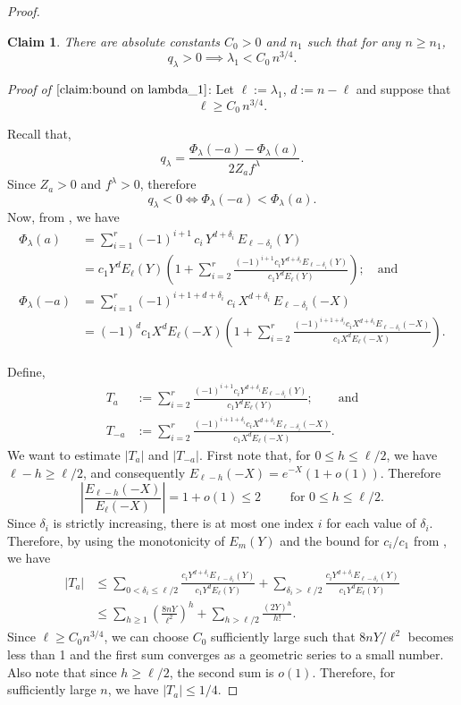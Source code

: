 \documentclass[12pt]{article}
\newtheorem{claim}{Claim}[theorem]
\theoremstyle{definition}
\newcommand{\1}{\mathbf 1}
\begin{document}
\begin{proof}
\begin{claim}\label{claim:bound on lambda_1}
    There are absolute constants $C_0>0$ and $n_1$ such that for any $n\geq n_1$, $$q_{\lambda}>0 \implies\lambda_1<C_0\,n^{3/4}.$$
\end{claim}
\textit{Proof of $\cref{claim:bound on lambda_1}$}: Let $\ell:=\lambda_1$, $d:=n-\ell$ and suppose that $$\ell\geq C_0\,n^{3/4}.$$

Recall that, 
$$q_{\lambda}=\frac{\Phi_\lambda(-a)-\Phi_\lambda(a)}
{2Z_af^\lambda}.$$
Since $Z_a>0$ and $f^\lambda>0$, therefore
$$q_{\lambda}<0\iff \Phi_\lambda(-a)<\Phi_\lambda(a).$$
Now, from , we have 
\begin{align*}
    \Phi_\lambda(a)
&=
\sum_{i=1}^{r}
(-1)^{i+1}\,c_i\,
Y^{d+\delta_i}\,
E_{\ell-\delta_i}(Y)\\
&=c_1Y^dE_{\ell}(Y)\left(1+\sum_{i=2}^r\frac{(-1)^{i+1}c_iY^{d+\delta_i}E_{\ell-\delta_i}(Y)}{c_1Y^{d}E_{\ell}(Y)}\right);
\quad\text{and} \\
\Phi_\lambda(-a)
&=
\sum_{i=1}^{r}
(-1)^{i+1+d+\delta_i}\,c_i\,
X^{d+\delta_i}\,
E_{\ell-\delta_i}(-X)\\
&=(-1)^d c_1X^dE_{\ell}(-X)\left(1+\sum_{i=2}^r\frac{(-1)^{i+1+\delta_i}c_iX^{d+\delta_i}E_{\ell-\delta_i}(-X)}{c_1X^{d}E_{\ell}(-X)}\right).
\end{align*}

Define,
\begin{align*}
    T_{a}&:=\sum_{i=2}^r\frac{(-1)^{i+1}c_iY^{d+\delta_i}E_{\ell-\delta_i}(Y)}{c_1Y^{d}E_{\ell}(Y)};\qquad \text{and}\\
    T_{-a}&:=\sum_{i=2}^r\frac{(-1)^{i+1+\delta_i}c_iX^{d+\delta_i}E_{\ell-\delta_i}(-X)}{c_1X^{d}E_{\ell}(-X)}.
\end{align*}
We want to estimate $|T_a|$ and $|T_{-a}|$. First note that, for $0\leq h\leq \ell/2$, we have $\ell-h\geq \ell/2$, and consequently $E_{\ell-h}
(-X)=e^{-X}(1+o(1))$. Therefore
$$\left|\frac{E_{\ell-h}(-X)}{E_{\ell}(-X)}\right|=1+o(1)\leq 2\qquad \text{ for }0\leq h\leq \ell/2.$$
Since $\delta_i$ is strictly increasing, there is at most one index $i$ for each value of $\delta_i$. Therefore, by using the monotonicity of $E_m(Y)$ and the bound for $c_i/c_1$ from , we have 
\begin{align*}
    |T_a|&\leq \sum_{0<\delta_i\leq \ell/2} \frac{c_iY^{d+\delta_i}E_{\ell-\delta_i}(Y)}{c_1Y^{d}E_{\ell}(Y)} + \sum_{\delta_i>\ell/2} \frac{c_iY^{d+\delta_i}E_{\ell-\delta_i}(Y)}{c_1Y^{d}E_{\ell}(Y)}\\
    &\leq \sum_{h\geq 1}\left(\frac{8nY}{\ell^2}\right)^h+\sum_{h>\ell/2}\frac{(2Y)^h}{h!}.
\end{align*}
Since $\ell\geq C_0n^{3/4}$, we can choose $C_0$ sufficiently large such that $8nY/\ell^2$ becomes less than 1 and the first sum converges as a geometric series to a small number. Also note that since $h\geq \ell/2$, the second sum is $o(1)$. Therefore, for sufficiently large $n$, we have $|T_{a}|\leq 1/4$.


\end{proof}
\end{document}
